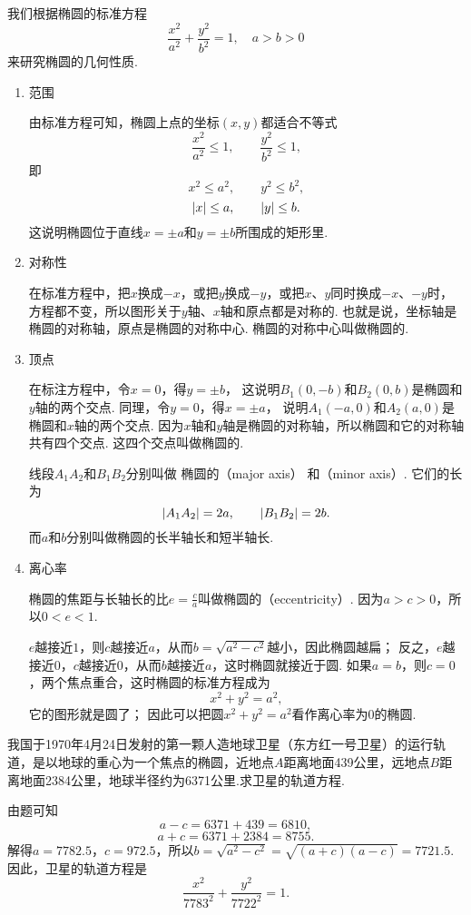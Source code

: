 我们根据椭圆的标准方程\[
	\frac{x^2}{a^2} + \frac{y^2}{b^2} = 1,
	\quad a > b > 0
\]来研究椭圆的几何性质.
\begin{enumerate}
\item 范围

由标准方程可知，椭圆上点的坐标\((x,y)\)都适合不等式\[
\frac{x^2}{a^2} \leq 1, \qquad \frac{y^2}{b^2} \leq 1,
\]即\[
x^2 \leq a^2, \qquad y^2 \leq b^2,
\]\[
\abs{x} \leq a, \qquad \abs{y} \leq b.
\]这说明椭圆位于直线\(x=\pm a\)和\(y=\pm b\)所围成的矩形里.

\item 对称性

在标准方程中，把\(x\)换成\(-x\)，或把\(y\)换成\(-y\)，或把\(x\)、\(y\)同时换成\(-x\)、\(-y\)时，
方程都不变，所以图形关于\(y\)轴、\(x\)轴和原点都是对称的.
也就是说，坐标轴是椭圆的对称轴，原点是椭圆的对称中心.
椭圆的对称中心叫做椭圆的.

\item 顶点

在标注方程中，令\(x=0\)，得\(y=\pm b\)，
这说明\(B_1(0,-b)\)和\(B_2(0,b)\)是椭圆和\(y\)轴的两个交点.
同理，令\(y=0\)，得\(x=\pm a\)，
说明\(A_1(-a,0)\)和\(A_2(a,0)\)是椭圆和\(x\)轴的两个交点.
因为\(x\)轴和\(y\)轴是椭圆的对称轴，所以椭圆和它的对称轴共有四个交点.
这四个交点叫做椭圆的.

线段\(A_1 A_2\)和\(B_1 B_2\)分别叫做%
椭圆的（major axis）%
和（minor axis）.
它们的长为\[
\abs{A_1 A_2} = 2a, \qquad \abs{B_1 B_2} = 2b.
\]而\(a\)和\(b\)分别叫做椭圆的长半轴长和短半轴长.

\item 离心率

椭圆的焦距与长轴长的比\(e = \frac{c}{a}\)叫做椭圆的（eccentricity）.
因为\(a > c > 0\)，所以\(0 < e < 1\).

\(e\)越接近\(1\)，则\(c\)越接近\(a\)，从而\(b = \sqrt{a^2 - c^2}\)越小，因此椭圆越扁；
反之，\(e\)越接近\(0\)，\(c\)越接近\(0\)，从而\(b\)越接近\(a\)，这时椭圆就接近于圆.
如果\(a=b\)，则\(c=0\)，两个焦点重合，这时椭圆的标准方程成为\[
x^2 + y^2 = a^2,
\]
它的图形就是圆了；
因此可以把圆\(x^2+y^2=a^2\)看作离心率为\(0\)的椭圆.
\end{enumerate}

\begin{example}
我国于1970年4月24日发射的第一颗人造地球卫星（东方红一号卫星）的运行轨道，是以地球的重心为一个焦点的椭圆，近地点\(A\)距离地面439公里，远地点\(B\)距离地面2384公里，地球半径约为6371公里.求卫星的轨道方程.
\begin{solution}
由题可知\[
a - c = 6371 + 439 = 6810,
\]\[
a + c = 6371 + 2384 = 8755.
\]解得\(a=7782.5\)，\(c=972.5\)，所以\(b=\sqrt{a^2-c^2}=\sqrt{(a+c)(a-c)}=7721.5\).因此，卫星的轨道方程是\[
\frac{x^2}{7783^2}+\frac{y^2}{7722^2}=1.
\]
\end{solution}
\end{example}

